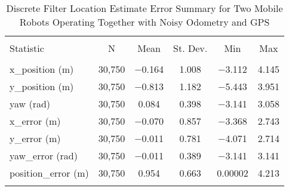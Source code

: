 
\begin{table}[htbp] \centering 
  \caption{Discrete Filter Location Estimate Error Summary for Two Mobile Robots Operating Together with Noisy Odometry and GPS} 
  \label{tab:two_mobile_discrete_summary} 
\begin{tabular}{@{\extracolsep{5pt}}lccccc} 
\\[-1.8ex]\hline 
\hline \\[-1.8ex] 
Statistic & \multicolumn{1}{c}{N} & \multicolumn{1}{c}{Mean} & \multicolumn{1}{c}{St. Dev.} & \multicolumn{1}{c}{Min} & \multicolumn{1}{c}{Max} \\ 
\hline \\[-1.8ex] 
x\_position (m) & 30,750 & \num{-0.164} & \num{1.008} & \num{-3.112} & \num{4.145} \\ 
y\_position (m) & 30,750 & \num{-0.813} & \num{1.182} & \num{-5.443} & \num{3.951} \\ 
yaw (rad) & 30,750 & \num{0.084} & \num{0.398} & \num{-3.141} & \num{3.058} \\ 
x\_error (m) & 30,750 & \num{-0.070} & \num{0.857} & \num{-3.368} & \num{2.743} \\ 
y\_error (m) & 30,750 & \num{-0.011} & \num{0.781} & \num{-4.071} & \num{2.714} \\ 
yaw\_error (rad) & 30,750 & \num{-0.011} & \num{0.389} & \num{-3.141} & \num{3.141} \\ 
position\_error (m) & 30,750 & \num{0.954} & \num{0.663} & \num{0.00002} & \num{4.213} \\ 
\hline \\[-1.8ex] 
\end{tabular} 
\end{table} 
